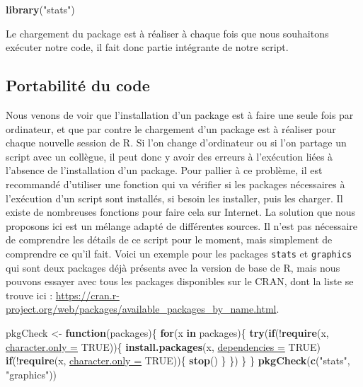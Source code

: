 \documentclass[twoside,symmetric]{book}
\newenvironment{Shaded}{}{}
\newcommand{\ControlFlowTok}[1]{\textbf{#1}}
\newcommand{\DataTypeTok}[1]{\underline{#1}}
\newcommand{\KeywordTok}[1]{\textbf{#1}}
\newcommand{\NormalTok}[1]{#1}
\newcommand{\OperatorTok}[1]{#1}
\newcommand{\OtherTok}[1]{#1}
\newcommand{\StringTok}[1]{#1}
\begin{document}
\begin{Shaded}
\begin{Highlighting}[]
\KeywordTok{library}\NormalTok{(}\StringTok{"stats"}\NormalTok{)}
\end{Highlighting}
\end{Shaded}

Le chargement du package est à réaliser à chaque fois que nous souhaitons exécuter notre code, il fait donc partie intégrante de notre script.

\hypertarget{portabilituxe9-du-code}{%
\subsection{Portabilité du code}\label{portabilituxe9-du-code}}

Nous venons de voir que l'installation d'un package est à faire une seule fois par ordinateur, et que par contre le chargement d'un package est à réaliser pour chaque nouvelle session de R. Si l'on change d'ordinateur ou si l'on partage un script avec un collègue, il peut donc y avoir des erreurs à l'exécution liées à l'absence de l'installation d'un package. Pour pallier à ce problème, il est recommandé d'utiliser une fonction qui va vérifier si les packages nécessaires à l'exécution d'un script sont installés, si besoin les installer, puis les charger. Il existe de nombreuses fonctions pour faire cela sur Internet. La solution que nous proposons ici est un mélange adapté de différentes sources. Il n'est pas nécessaire de comprendre les détails de ce script pour le moment, mais simplement de comprendre ce qu'il fait. Voici un exemple pour les packages \texttt{stats} et \texttt{graphics} qui sont deux packages déjà présents avec la version de base de R, mais nous pouvons essayer avec tous les packages disponibles sur le CRAN, dont la liste se trouve ici : \url{https://cran.r-project.org/web/packages/available_packages_by_name.html}.

\begin{Shaded}
\begin{Highlighting}[]
\NormalTok{pkgCheck <-}\StringTok{ }\ControlFlowTok{function}\NormalTok{(packages)\{}
    \ControlFlowTok{for}\NormalTok{(x }\ControlFlowTok{in}\NormalTok{ packages)\{}
        \KeywordTok{try}\NormalTok{(}\ControlFlowTok{if}\NormalTok{(}\OperatorTok{!}\KeywordTok{require}\NormalTok{(x, }\DataTypeTok{character.only =} \OtherTok{TRUE}\NormalTok{))\{}
            \KeywordTok{install.packages}\NormalTok{(x, }\DataTypeTok{dependencies =} \OtherTok{TRUE}\NormalTok{)}
            \ControlFlowTok{if}\NormalTok{(}\OperatorTok{!}\KeywordTok{require}\NormalTok{(x, }\DataTypeTok{character.only =} \OtherTok{TRUE}\NormalTok{))\{}
                \KeywordTok{stop}\NormalTok{()}
\NormalTok{            \}}
\NormalTok{        \})}
\NormalTok{    \}}
\NormalTok{\}}
\KeywordTok{pkgCheck}\NormalTok{(}\KeywordTok{c}\NormalTok{(}\StringTok{"stats"}\NormalTok{, }\StringTok{"graphics"}\NormalTok{))}
\end{Highlighting}
\end{Shaded}
\end{document}
